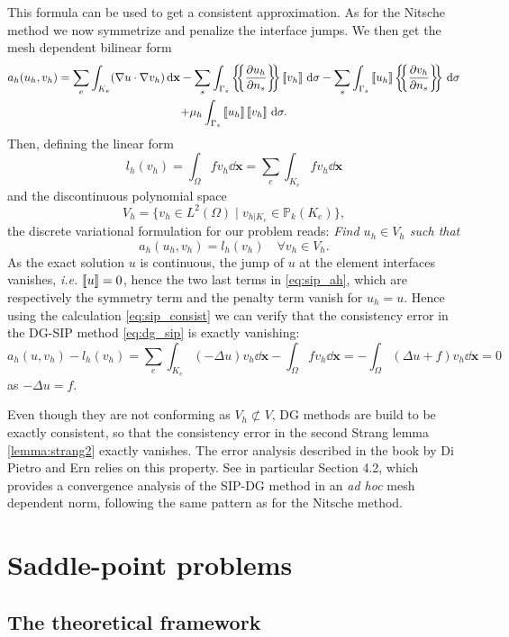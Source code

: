 This formula can be used to get a consistent approximation. As for the Nitsche method we now symmetrize and penalize the interface jumps. We then get the mesh dependent bilinear form
\begin{multline}\label{eq:sip_ah}
a_h(u_h,v_h) =  \sum_e  \int_{K_e}(\nabla u \cdot \nabla v_h) \dd \mathbf{x} 
- \sum_s  \int_{\Gamma_s}\lbav \fracp{u_h}{n_s}\rbav\ljump v_h \rjump \dd \sigma 
-\sum_s   \int_{\Gamma_s}\ljump u_h \rjump\lbav \fracp{v_h}{n_s}\rbav \dd \sigma \\
+\mu_h  \int_{\Gamma_s}\ljump u_h \rjump\ljump v_h\rjump \dd \sigma. 
\end{multline}
Then, defining the linear form
$$l_h(v_h) = \int_\Omega f v_h \dd \mathbf{x} =   \sum_e  \int_{K_e}f v_h \dd \mathbf{x}  $$
 and the discontinuous polynomial space
$$V_h=\{ v_h\in L^2(\Omega) \;|\; v_{h|K_e}\in \mathbb{P}_k(K_e) \},$$
 the discrete variational formulation for our problem reads: \emph{Find $u_h\in V_h$ such that }
\begin{equation}\label{eq:dg_sip}
a_h(u_h,v_h) = l_h(v_h) \quad\forall v_h\in V_h.
\end{equation} 
As the exact solution $u$ is continuous, the jump of $u$ at the element interfaces vanishes, \textit{i.e.}
$\left[ \!\left[ u \right]\! \right]=0$, hence the two last terms in \eqref{eq:sip_ah}, which are respectively the symmetry term and the penalty term vanish for $u_h=u$. Hence using the calculation \eqref{eq:sip_consist} we can verify that the consistency error in the DG-SIP method \eqref{eq:dg_sip} is exactly vanishing:
$$a_h(u,v_h) - l_h(v_h) = \sum_e \int_{K_e} (-\Delta u) v_h \dd \mathbf{x} - \int_\Omega f v_h \dd \mathbf{x} = -\int_\Omega (\Delta u+f) v_h \dd \mathbf{x} = 0$$
as $-\Delta u=f$.

Even though they are not conforming as $V_h\not\subset V$, DG methods are build to be exactly consistent, so that the consistency error in the second Strang lemma \ref{lemma:strang2} exactly vanishes. The error analysis described in the book by Di Pietro and Ern \cite{dipietro2012} relies on this property. See in particular Section 4.2, which provides a convergence analysis of the SIP-DG method in an \textit{ad hoc} mesh dependent norm, following the same pattern as for the Nitsche method. 

\section{Saddle-point problems}

\subsection{The theoretical framework} 

